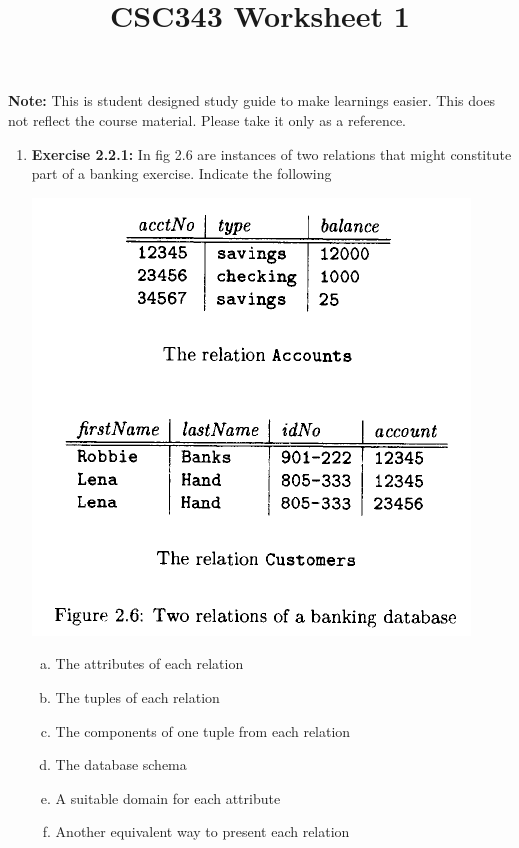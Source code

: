 \documentclass[12pt]{article}
\begin{document}
\title{CSC343 Worksheet 1}
\maketitle

\noindent \textbf{Note:} This is student designed study guide to make learnings easier.
This does not reflect the course material. Please take it only as a reference.

\begin{enumerate}[1.]
    \item \textbf{Exercise 2.2.1:} In fig 2.6 are instances of two relations that might
    constitute part of a banking exercise. Indicate the following

    \begin{center}
    \includegraphics[width=\linewidth]{images/worksheet_1_1.png}
    \end{center}

    \begin{enumerate}[a)]
        \item The attributes of each relation
        \item The tuples of each relation
        \item The components of one tuple from each relation
        \item The database schema
        \item A suitable domain for each attribute
        \item Another equivalent way to present each relation
    \end{enumerate}


\end{enumerate}
\end{document}
